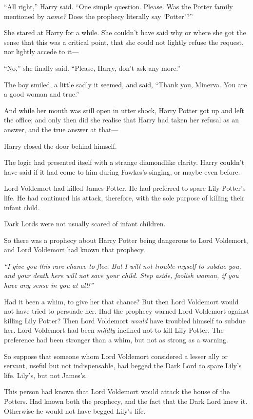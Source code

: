 ``All right,'' Harry said. ``One simple question. Please. Was the Potter
family mentioned by \emph{name?} Does the prophecy literally say
`Potter'?''

She stared at Harry for a while. She couldn't have said why or where she
got the sense that this was a critical point, that she could not lightly
refuse the request, nor lightly accede to it---

``No,'' she finally said. ``Please, Harry, don't ask any more.''

The boy smiled, a little sadly it seemed, and said, ``Thank you,
Minerva. You are a good woman and true.''

And while her mouth was still open in utter shock, Harry Potter got up
and left the office; and only then did she realise that Harry had taken
her refusal as an answer, and the true answer at that---

Harry closed the door behind himself.

The logic had presented itself with a strange diamondlike clarity. Harry
couldn't have said if it had come to him during Fawkes's singing, or
maybe even before.

Lord Voldemort had killed James Potter. He had preferred to spare Lily
Potter's life. He had continued his attack, therefore, with the sole
purpose of killing their infant child.

Dark Lords were not usually scared of infant children.

So there was a prophecy about Harry Potter being dangerous to Lord
Voldemort, and Lord Voldemort had known that prophecy.

\emph{``I give you this rare chance to flee. But I will not trouble
myself to subdue you, and your death here will not save your child. Step
aside, foolish woman, if you have any sense in you at all!''}

Had it been a whim, to give her that chance? But then Lord Voldemort
would not have tried to persuade her. Had the prophecy warned Lord
Voldemort against killing Lily Potter? Then Lord Voldemort \emph{would}
have troubled himself to subdue her. Lord Voldemort had been
\emph{mildly} inclined not to kill Lily Potter. The preference had been
stronger than a whim, but not as strong as a warning.

So suppose that someone whom Lord Voldemort considered a lesser ally or
servant, useful but not indispensable, had begged the Dark Lord to spare
Lily's life. Lily's, but not James's.

This person had known that Lord Voldemort would attack the house of the
Potters. Had known both the prophecy, and the fact that the Dark Lord
knew it. Otherwise he would not have begged Lily's life.


